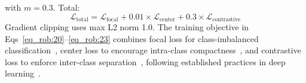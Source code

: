 \documentclass[10pt,letterpaper]{article}
\begin{document}
                                                                                                                  with $m=0.3$. Total:
                                                                                                                  \begin{equation} \label{eq_rob:23}
                                                                                                                  \mathcal{L}_{\text{total}}=
                                                                                                                  \mathcal{L}_{\text{focal}} + 0.01\times\mathcal{L}_{\text{center}} + 0.3\times\mathcal{L}_{\text{contrastive}}
                                                                                                                  \end{equation}
                                                                                                                  Gradient clipping uses max L2 norm 1.0. 
                                                                                                                  The training objective in Eqs~\eqref{eq_rob:20}--\eqref{eq_rob:23} combines focal loss for class-imbalanced classification~\cite{ref53}, center loss to encourage intra-class compactness~\cite{ref54}, and contrastive loss to enforce inter-class separation~\cite{ref55}, following established practices in deep learning~\cite{ref50}.
\end{document}
